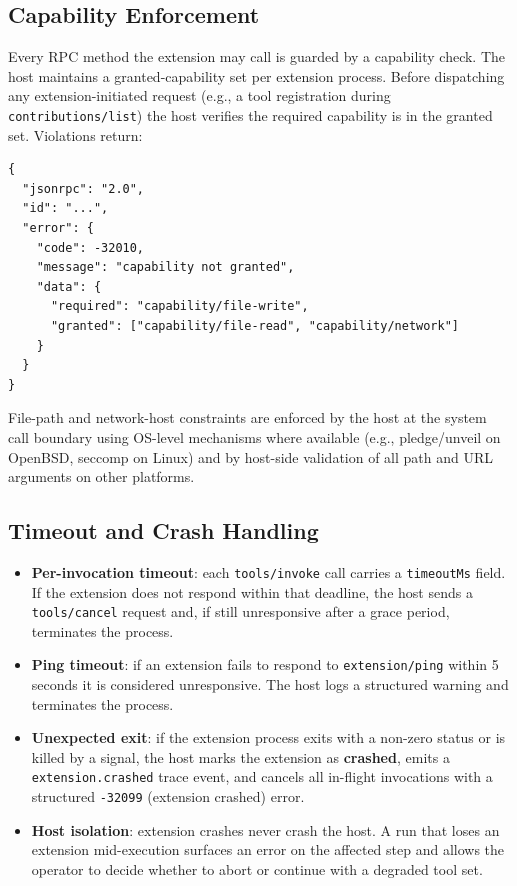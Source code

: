 \subsection{Capability Enforcement}

Every RPC method the extension may call is guarded by a capability check.  The
host maintains a granted-capability set per extension process.  Before
dispatching any extension-initiated request (e.g., a tool registration during
\texttt{contributions/list}) the host verifies the required capability is in
the granted set.  Violations return:

\begin{verbatim}
{
  "jsonrpc": "2.0",
  "id": "...",
  "error": {
    "code": -32010,
    "message": "capability not granted",
    "data": {
      "required": "capability/file-write",
      "granted": ["capability/file-read", "capability/network"]
    }
  }
}
\end{verbatim}

File-path and network-host constraints are enforced by the host at the system
call boundary using OS-level mechanisms where available (e.g., pledge/unveil on
OpenBSD, seccomp on Linux) and by host-side validation of all path and URL
arguments on other platforms.

\subsection{Timeout and Crash Handling}
\label{sec:ext-crash}

\begin{itemize}
  \item \textbf{Per-invocation timeout}: each \texttt{tools/invoke} call
        carries a \texttt{timeoutMs} field.  If the extension does not respond
        within that deadline, the host sends a \texttt{tools/cancel} request
        and, if still unresponsive after a grace period, terminates the process.
  \item \textbf{Ping timeout}: if an extension fails to respond to
        \texttt{extension/ping} within 5 seconds it is considered unresponsive.
        The host logs a structured warning and terminates the process.
  \item \textbf{Unexpected exit}: if the extension process exits with a
        non-zero status or is killed by a signal, the host marks the extension
        as \textbf{crashed}, emits a \texttt{extension.crashed} trace event,
        and cancels all in-flight invocations with a structured
        \texttt{-32099} (extension crashed) error.
  \item \textbf{Host isolation}: extension crashes never crash the host.  A
        run that loses an extension mid-execution surfaces an error on the
        affected step and allows the operator to decide whether to abort or
        continue with a degraded tool set.
\end{itemize}
